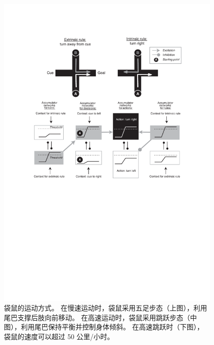 \begin{figure}[!htb]
	\centering
	\includegraphics[width=1.0\linewidth]{chap3/3_6}
	\caption{袋鼠的运动方式。
		在慢速运动时，袋鼠采用五足步态（上图），利用尾巴支撑后肢向前移动。
		在高速运动时，袋鼠采用跳跃步态（中图），利用尾巴保持平衡并控制身体倾斜。
		在高速跳跃时（下图），袋鼠的速度可以超过 50 公里/小时\cite{dawson1977kangaroos}。 \label{fig:3_6}}
\end{figure}


